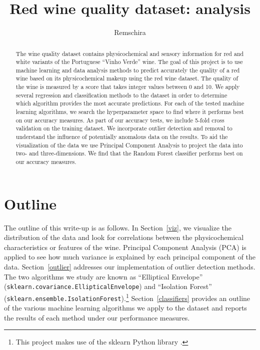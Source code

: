 \documentclass[12pt,preprint]{aastex61}
\begin{document}
\title{Red wine quality dataset: analysis} 

  \author{Remschira}

\begin{abstract}

  The wine quality dataset \citep{Cortez_etal_2009} contains
physicochemical and sensory information for red and white variants of
the Portuguese ``Vinho Verde'' wine. The goal of this project is to
use machine learning and data analysis methods to predict accurately
the quality of a red wine based on its physicochemical makeup using
the red wine dataset. The quality of the wine is measured by a score
that takes integer values between 0 and 10. We apply several
regression and classification methods to the dataset in order to
determine which algorithm provides the most accurate predictions. For
each of the tested machine learning algorithms, we search the
hyperparameter space to find where it performs best on our accuracy
measures. As part of our accuracy tests, we include 5-fold cross
validation on the training dataset. We incorporate outlier detection
and removal to understand the influence of potentially anomalous data
on the results. To aid the visualization of the data we use Principal
Component Analysis to project the data into two- and
three-dimensions. We find that the Random Forest classifier performs
best on our accuracy measures.


\end{abstract}
  

\section{Outline\label{Outline}}


The outline of this write-up is as follows. In Section~\ref{viz}, we
visualize the distribution of the data and look for correlations
between the physicochemical characteristics or features of the
wine. Principal Component Analysis (PCA) is applied to see how much
variance is explained by each principal component of the
data. Section~\ref{outlier} addresses our implementation of outlier
detection methods. The two algorithms we study are known as
``Elliptical Envelope''
(\texttt{sklearn.covariance.EllipticalEnvelope}) and ``Isolation
Forest'' (\texttt{sklearn.ensemble.IsolationForest}).\footnote{This
project makes use of the sklearn Python library
\citep{Pedregosa_etal_2011}.}  Section~\ref{classifiers} provides an
outline of the various machine learning algorithms we apply to the
dataset and reports the results of each method under our performance
measures.
\end{document}
